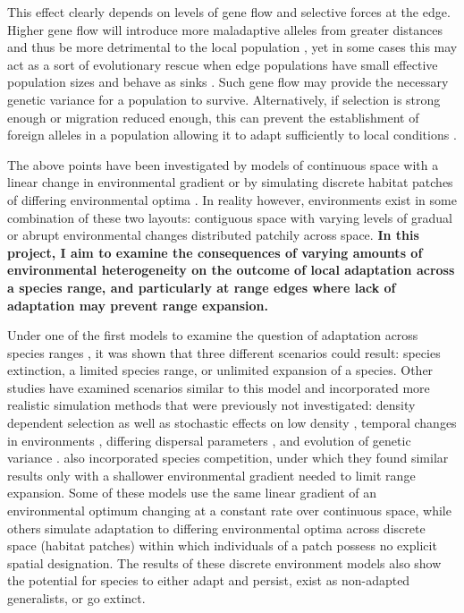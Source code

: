 This effect clearly depends on levels of gene flow and selective forces at the edge. Higher gene flow will introduce more maladaptive alleles from greater distances and thus be more detrimental to the local population \citep{GarciaRamos:1997}, yet in some cases this may act as a sort of evolutionary rescue when edge populations have small effective population sizes and behave as sinks \citep{Holt:1997,Gomulkiewicz:1999,Ching:2012}. Such gene flow may provide the necessary genetic variance for a population to survive. Alternatively, if selection is strong enough or migration reduced enough, this can prevent the establishment of foreign alleles in a population allowing it to adapt sufficiently to local conditions \citep{Ronce:2001}.

The above points have been investigated by models of continuous space with a linear change in environmental gradient \citep{Pease:1989,Kirkpatrick:1997,GarciaRamos:1997,Case:2000,Polechova:2009,Bridle:2010} or by simulating discrete habitat patches of differing environmental optima \citep{Aguilee:2012,Ronce:2001,Gomulkiewicz:1999}. In reality however, environments exist in some combination of these two layouts: contiguous space with varying levels of gradual or abrupt environmental changes distributed patchily across space. \textbf{In this project, I aim to examine the consequences of varying amounts 
of environmental heterogeneity on the outcome of local adaptation across a species range, and particularly at range edges where lack of adaptation may prevent range expansion.}

Under one of the first models to examine the question of adaptation across species ranges \citep{Kirkpatrick:1997}, it was shown that three different scenarios could result: species extinction, a limited species range, or unlimited expansion of a species. Other studies have examined scenarios similar to this model and incorporated more realistic simulation methods that were previously not investigated: density dependent selection \citep{GarciaRamos:1997,Gomulkiewicz:1999} as well as stochastic effects on low density \citep{Bridle:2010}, temporal changes in environments \citep{Pease:1989}, differing dispersal parameters \citep{Aguilee:2012}, and 
evolution of genetic variance \citep{Barton:2001,Polechova:2009}. \citet{Case:2000} also incorporated species competition, under which they found similar results only with a shallower environmental gradient needed to limit range expansion. Some of these models use the same linear gradient of an environmental optimum changing at a constant rate over continuous space, while others simulate adaptation to differing environmental optima across discrete space (habitat patches) within which  individuals of a patch possess no explicit spatial designation. The results of these discrete environment models also show the potential for species to either 
adapt and persist, exist as non-adapted generalists, or go extinct.

